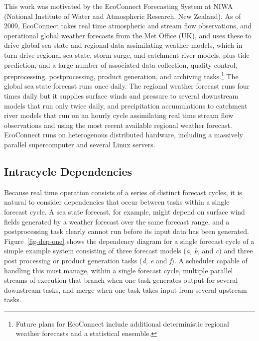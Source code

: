 \documentclass[11pt,a4paper]{article}
\begin{document}
This work was motivated by the EcoConnect Forecasting System at NIWA
(National Institute of Water and Atmospheric Research, New Zealand). As
of 2009, EcoConnect takes real time atmospheric and stream flow
observations, and operational global weather forecasts from the Met
Office (UK), and uses these to drive global sea state and regional data
assimilating weather models, which in turn drive regional sea state,
storm surge, and catchment river models, plus tide prediction, and a
large number of associated data collection, quality control,
preprocessing, postprocessing, product generation, and archiving
tasks.\footnote{Future plans for EcoConnect include additional
deterministic regional weather forecasts and a statistical ensemble.}
The global sea state forecast runs once daily.  The regional weather
forecast runs four times daily but it supplies surface winds and
pressure to several downstream models that run only twice daily, and
precipitation accumulations to catchment river models that run on an
hourly cycle assimilating real time stream flow observations and using
the most recent available regional weather forecast.  EcoConnect runs on
heterogenous distributed hardware, including a massively parallel
supercomputer and several Linux servers. 

\subsection{Intracycle Dependencies} 
\label{IntracycleDependencies}

Because real time operation consists of a series of distinct forecast
cycles, it is natural to consider dependencies that occur between tasks
within a single forecast cycle. A sea state forecast, for example, might
depend on surface wind fields generated by a weather forecast over the
same forecast range, and a postprocessing task clearly cannot run before
its input data has been generated. Figure~\ref{fig-dep-one} shows the
dependency diagram for a single forecast cycle of a simple example
system consisting of three forecast models ({\em a, b,} and {\em c}) and
three post processing or product generation tasks ({\em d, e} and {\em
f}).  A scheduler capable of handling this must manage, within a single
forecast cycle, multiple parallel streams of execution that branch when
one task generates output for several downstream tasks, and merge when
one task takes input from several upstream tasks. 
\end{document}
